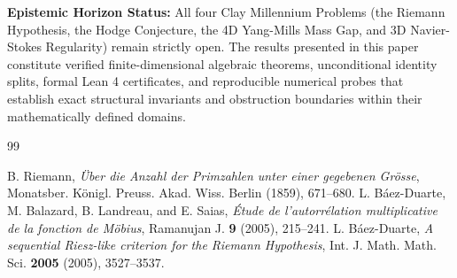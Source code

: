 \documentclass[11pt,a4paper]{article}
\theoremstyle{definition}
\begin{document}
\vspace{0.5em}
\noindent\textbf{Epistemic Horizon Status:} All four Clay Millennium Problems (the Riemann Hypothesis, the Hodge Conjecture, the 4D Yang-Mills Mass Gap, and 3D Navier-Stokes Regularity) remain strictly open. The results presented in this paper constitute verified finite-dimensional algebraic theorems, unconditional identity splits, formal Lean 4 certificates, and reproducible numerical probes that establish exact structural invariants and obstruction boundaries within their mathematically defined domains.

\begin{thebibliography}{99}

 B. Riemann, \emph{\"Uber die Anzahl der Primzahlen unter einer gegebenen Gr\"osse}, Monatsber. K\"onigl. Preuss. Akad. Wiss. Berlin (1859), 671--680.
 L. B\'aez-Duarte, M. Balazard, B. Landreau, and E. Saias, \emph{\'Etude de l'autorr\'elation multiplicative de la fonction de M\"obius}, Ramanujan J. \textbf{9} (2005), 215--241.
 L. B\'aez-Duarte, \emph{A sequential Riesz-like criterion for the Riemann Hypothesis}, Int. J. Math. Math. Sci. \textbf{2005} (2005), 3527--3537.

\end{thebibliography}
\end{document}
